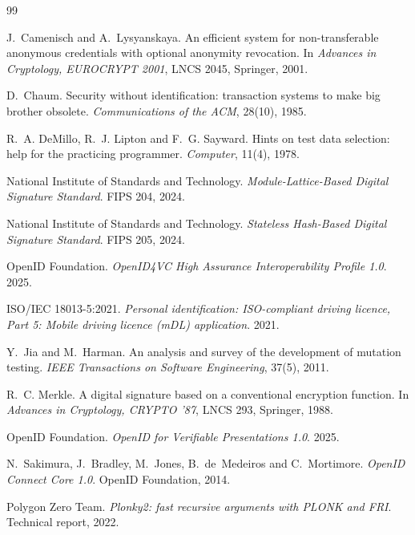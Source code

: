 \begin{thebibliography}{99}
\small

 J.~Camenisch and A.~Lysyanskaya. An efficient system for non-transferable
  anonymous credentials with optional anonymity revocation. In \emph{Advances in Cryptology,
  EUROCRYPT 2001}, LNCS 2045, Springer, 2001.

 D.~Chaum. Security without identification: transaction systems to make big
  brother obsolete. \emph{Communications of the ACM}, 28(10), 1985.

 R.~A. DeMillo, R.~J. Lipton and F.~G. Sayward. Hints on test data selection:
  help for the practicing programmer. \emph{Computer}, 11(4), 1978.

 National Institute of Standards and Technology. \emph{Module-Lattice-Based
  Digital Signature Standard}. FIPS 204, 2024.

 National Institute of Standards and Technology. \emph{Stateless Hash-Based
  Digital Signature Standard}. FIPS 205, 2024.

 OpenID Foundation. \emph{OpenID4VC High Assurance Interoperability Profile 1.0}.
  2025.

 ISO/IEC 18013-5:2021. \emph{Personal identification: ISO-compliant driving
  licence, Part 5: Mobile driving licence (mDL) application}. 2021.

 Y.~Jia and M.~Harman. An analysis and survey of the development of mutation
  testing. \emph{IEEE Transactions on Software Engineering}, 37(5), 2011.

 R.~C. Merkle. A digital signature based on a conventional encryption function.
  In \emph{Advances in Cryptology, CRYPTO '87}, LNCS 293, Springer, 1988.

 OpenID Foundation. \emph{OpenID for Verifiable Presentations 1.0}. 2025.

 N.~Sakimura, J.~Bradley, M.~Jones, B.~de~Medeiros and C.~Mortimore. \emph{OpenID
  Connect Core 1.0}. OpenID Foundation, 2014.

 Polygon Zero Team. \emph{Plonky2: fast recursive arguments with PLONK and FRI}.
  Technical report, 2022.


\end{thebibliography}

